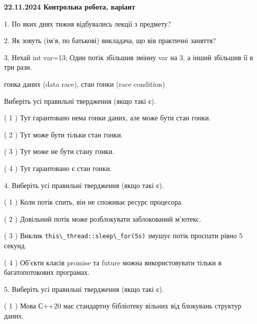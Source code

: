 \documentclass[12pt, ukrainian]{article}
\def\code#1{\Verb!#1!}
\begin{document}
\vspace{4mm}
\newpage
\begin {large}

\textbf{22.11.2024 Контрольна робота, варіант  }\par


{
1. По яких днях тижня відбувались лекції з предмету?



\vspace{5mm}
2. Як зовуть (ім'я, по батькові) викладача, що вів практичні заняття?



\vspace{5mm}
3. Нехай int var=13; Один потік збільшив змінну var на 3, а інший збільшив її в три рази.

гонка даних (data race), стан гонки (race condition)

Виберіть усі правильні твердження (якщо такі є).\par
\vspace{2mm}
( 1 ) Тут гарантовано нема гонки даних, але може бути стан гонки.%

( 2 ) Тут може бути тільки стан гонки.%

( 3 ) Тут може не бути стану гонки.%

( 4 ) Тут гарантовано є стан гонки.%


\vspace{5mm}
4. Виберіть усі правильні твердження (якщо такі є).\par
\vspace{2mm}

( 1 ) Коли потік спить, він не споживає ресурс процесора.%

( 2 ) Довільний потік може розблокувати заблокований м’ютекс.%

( 3 ) Виклик \code{this\_thread::sleep\_for(5s)} змушує потік проспати рівно 5 секунд.%

( 4 ) Об’єкти класів promise та future можна використовувати тільки в багатопотокових програмах.%


\vspace{5mm}
5. Виберіть усі правильні твердження (якщо такі є).\par
\vspace{2mm}

( 1 ) Мова С++20 має стандартну бібліотеку вільних від блокувань структур даних.%

}
\end{large}
\end{document}
